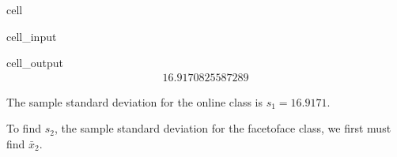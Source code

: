 \documentclass[letterpaper,10pt,english]{jupyterBook}
\begin{document}
\begin{sphinxuseclass}{cell}\begin{sphinxVerbatimInput}

\begin{sphinxuseclass}{cell_input}
\begin{sphinxVerbatim}[commandchars=\\\{\}]
\end{sphinxVerbatim}

\end{sphinxuseclass}\end{sphinxVerbatimInput}
\begin{sphinxVerbatimOutput}

\begin{sphinxuseclass}{cell_output}\begin{equation*}
\begin{split}16.9170825587289\end{split}
\end{equation*}
\end{sphinxuseclass}\end{sphinxVerbatimOutput}

\end{sphinxuseclass}
\sphinxAtStartPar
The sample standard deviation for the online class is \(s_1 = 16.9171\).

\sphinxAtStartPar
{}

\sphinxAtStartPar
To find \(s_2\), the sample standard deviation for the face\sphinxhyphen{}to\sphinxhyphen{}face class, we first must find \(\bar{x}_2\).
\end{document}
